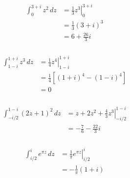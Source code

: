 \documentclass{article}
\begin{document}
\setcounter{subsubsection}{4}
\subsubsection{}

\begin{align*}
  \int_0^{3 + i} z^2 \,d z & = \left. \frac{1}{3} z^3 \right|_0^{3 + i} \\
                           & = \frac{1}{3} (3 + i)^3                    \\
                           & = 6 + \frac{26}{3} i
\end{align*}

\setcounter{subsubsection}{6}
\subsubsection{}

\begin{align*}
  \int_{1 - i}^{1 + i} z^3 \,d z & = \left. \frac{1}{4} z^4 \right|_{1 - i}^{1 + i} \\
                                 & = \frac{1}{4} [(1 + i)^4 - (1 - i)^4]            \\
                                 & = 0
\end{align*}

\setcounter{subsubsection}{8}
\subsubsection{}

\begin{align*}
  \int_{-i / 2}^{1 - i} (2 z + 1)^2 \,d z & = \left. z + 2 z^2 + \frac{4}{3} z^3 \right|_{-i / 2}^{1 - i} \\
                                          & = -\frac{7}{6} - \frac{22}{3} i
\end{align*}

\setcounter{subsubsection}{10}
\subsubsection{}

\begin{align*}
  \int_{i / 2}^i e^{\pi z} \,d z & = \left. \frac{1}{\pi} e^{\pi z} \right|_{i / 2}^i \\
                                 & = -\frac{1}{\pi} (1 + i)
\end{align*}

\setcounter{subsubsection}{12}
\end{document}
